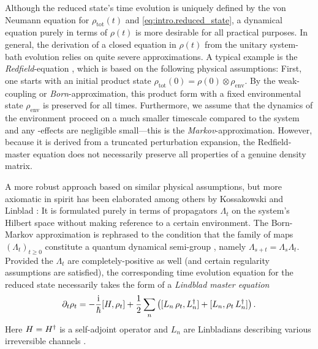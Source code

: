 Although the reduced state's time evolution is uniquely defined by the von Neumann equation for $\rho_\mathrm{tot}(t)$ and \autoref{eq:intro.reduced_state}, a dynamical equation purely in terms of $\rho(t)$ is more desirable for all practical purposes.
In general, the derivation of a closed equation in $\rho(t)$ from the unitary system-bath evolution relies on quite severe approximations.
A typical example is the \emph{Redfield}-equation \cite{BrPe2002_open_quantum}, which is based on the following physical assumptions:
First, one starts with an initial product state $\rho_\mathrm{tot}(0) = \rho(0) \otimes \rho_\mathrm{env}$.
By the weak-coupling or \emph{Born}-approximation, this product form with a fixed environmental state $\rho_\mathrm{env}$ is preserved for all times.
Furthermore, we assume that the dynamics of the environment proceed on a much smaller timescale compared to the system and any -effects are negligible small---this is the \emph{Markov}-approximation.
However, because it is derived from a truncated perturbation expansion, the Redfield-master equation does not necessarily preserve all properties of a genuine density matrix.


A more robust approach based on similar physical assumptions, but more axiomatic in spirit has been elaborated among others by Kossakowski and Linblad \cite{Ko72_linblad,Li76_generators_qdsg}:
It is formulated purely in terms of propagators $\Lambda_t$ on the system's Hilbert space without making reference to a certain environment.
The Born-Markov approximation is rephrased to the condition that the family of maps $(\Lambda_t)_{t\ge 0}$ constitute a quantum dynamical semi-group \cite{AlLe87_qds}, namely $\Lambda_{s+t} = \Lambda_s\Lambda_t$.
Provided the $\Lambda_t$ are completely-positive as well (and certain regularity assumptions are satisfied), the corresponding time evolution equation for the reduced state necessarily takes the form of a \emph{Lindblad master equation}
\begin{equation}
  \partial_t \rho_t = - \frac{\mathrm{i}}{\hbar} [H, \rho_t] + \frac{1}{2}\sum_n \left( [L_n\,\rho_t, L^\dagger_n] + [L_n, \rho_t\,L^\dagger_n] \right).
  \label{eq:intro.linblad}
\end{equation}
Here $H = H^\dagger$ is a self-adjoint operator and $L_n$ are Linbladians describing various irreversible channels \cite{WiMi10_measurement}.

